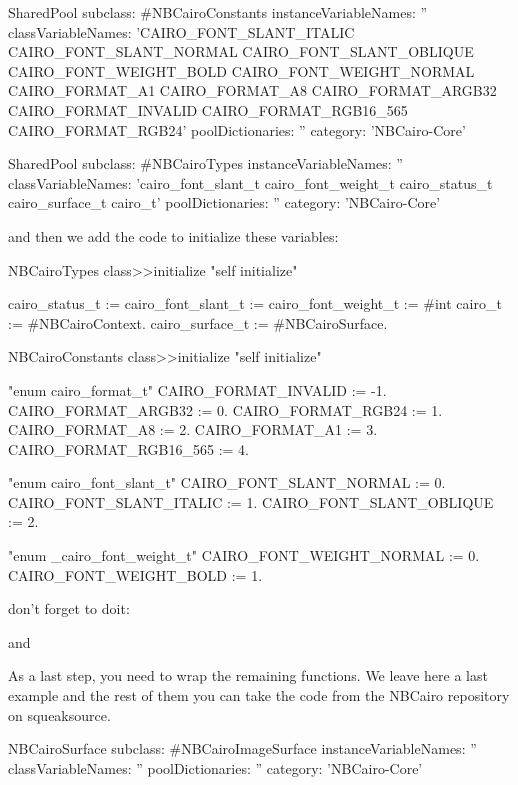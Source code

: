 \documentclass[a4paper,10pt,twoside]{book}
\begin{document}
\begin{code}{}
SharedPool subclass: #NBCairoConstants
	instanceVariableNames: ''
	classVariableNames: 'CAIRO_FONT_SLANT_ITALIC CAIRO_FONT_SLANT_NORMAL CAIRO_FONT_SLANT_OBLIQUE CAIRO_FONT_WEIGHT_BOLD CAIRO_FONT_WEIGHT_NORMAL CAIRO_FORMAT_A1 CAIRO_FORMAT_A8 CAIRO_FORMAT_ARGB32 CAIRO_FORMAT_INVALID CAIRO_FORMAT_RGB16_565 CAIRO_FORMAT_RGB24'
	poolDictionaries: ''
	category: 'NBCairo-Core'

SharedPool subclass: #NBCairoTypes
	instanceVariableNames: ''
	classVariableNames: 'cairo_font_slant_t cairo_font_weight_t cairo_status_t cairo_surface_t cairo_t'
	poolDictionaries: ''
	category: 'NBCairo-Core'
\end{code}

and then we add the code to initialize these variables:

\begin{code}{}
NBCairoTypes class>>initialize
  "self initialize"

  cairo_status_t := cairo_font_slant_t := cairo_font_weight_t := #int
  cairo_t := #NBCairoContext.
  cairo_surface_t  := #NBCairoSurface.


NBCairoConstants class>>initialize
  "self initialize"

  "enum cairo_format_t"
  CAIRO_FORMAT_INVALID :=  -1.
  CAIRO_FORMAT_ARGB32 :=  0.
  CAIRO_FORMAT_RGB24 := 1.
  CAIRO_FORMAT_A8 := 2.
  CAIRO_FORMAT_A1 := 3.
  CAIRO_FORMAT_RGB16_565 := 4.

  "enum cairo_font_slant_t"
  CAIRO_FONT_SLANT_NORMAL := 0.
  CAIRO_FONT_SLANT_ITALIC := 1.
  CAIRO_FONT_SLANT_OBLIQUE := 2.

  "enum _cairo_font_weight_t"
  CAIRO_FONT_WEIGHT_NORMAL := 0.
  CAIRO_FONT_WEIGHT_BOLD := 1.
\end{code}

don't forget to doit:


and


As a last step, you need to wrap the remaining functions.
We leave here a last example and the rest of them you can
take the code from the NBCairo repository on squeaksource.

\begin{classdef}{}
NBCairoSurface subclass: #NBCairoImageSurface
	instanceVariableNames: ''
	classVariableNames: ''
	poolDictionaries: ''
	category: 'NBCairo-Core'
\end{classdef}
\end{document}
